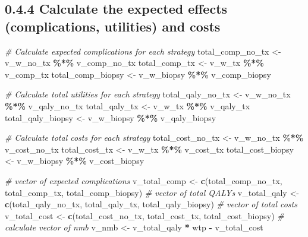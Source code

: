 \documentclass[
]{article}
\newenvironment{Shaded}{\begin{snugshade}}{\end{snugshade}}
\newcommand{\CommentTok}[1]{\textcolor[rgb]{0.56,0.35,0.01}{\textit{#1}}}
\newcommand{\FunctionTok}[1]{\textcolor[rgb]{0.13,0.29,0.53}{\textbf{#1}}}
\newcommand{\NormalTok}[1]{#1}
\newcommand{\OtherTok}[1]{\textcolor[rgb]{0.56,0.35,0.01}{#1}}
\newcommand{\SpecialCharTok}[1]{\textcolor[rgb]{0.81,0.36,0.00}{\textbf{#1}}}
\begin{document}
\hypertarget{calculate-the-expected-effects-complications-utilities-and-costs}{%
\subsection{0.4.4 Calculate the expected effects (complications,
utilities) and
costs}\label{calculate-the-expected-effects-complications-utilities-and-costs}}

\begin{Shaded}
\begin{Highlighting}[]
\CommentTok{\# Calculate expected complications for each strategy }
\NormalTok{total\_comp\_no\_tx  }\OtherTok{\textless{}{-}}\NormalTok{ v\_w\_no\_tx  }\SpecialCharTok{\%*\%}\NormalTok{  v\_comp\_no\_tx      }
\NormalTok{total\_comp\_tx     }\OtherTok{\textless{}{-}}\NormalTok{ v\_w\_tx     }\SpecialCharTok{\%*\%}\NormalTok{  v\_comp\_tx}
\NormalTok{total\_comp\_biopsy }\OtherTok{\textless{}{-}}\NormalTok{ v\_w\_biopsy }\SpecialCharTok{\%*\%}\NormalTok{  v\_comp\_biopsy}
  
\CommentTok{\# Calculate total utilities for each strategy }
\NormalTok{total\_qaly\_no\_tx  }\OtherTok{\textless{}{-}}\NormalTok{ v\_w\_no\_tx  }\SpecialCharTok{\%*\%}\NormalTok{  v\_qaly\_no\_tx      }
\NormalTok{total\_qaly\_tx     }\OtherTok{\textless{}{-}}\NormalTok{ v\_w\_tx     }\SpecialCharTok{\%*\%}\NormalTok{  v\_qaly\_tx}
\NormalTok{total\_qaly\_biopsy }\OtherTok{\textless{}{-}}\NormalTok{ v\_w\_biopsy }\SpecialCharTok{\%*\%}\NormalTok{  v\_qaly\_biopsy}
  
\CommentTok{\# Calculate total costs for each strategy }
\NormalTok{total\_cost\_no\_tx  }\OtherTok{\textless{}{-}}\NormalTok{ v\_w\_no\_tx  }\SpecialCharTok{\%*\%}\NormalTok{  v\_cost\_no\_tx    }
\NormalTok{total\_cost\_tx     }\OtherTok{\textless{}{-}}\NormalTok{ v\_w\_tx     }\SpecialCharTok{\%*\%}\NormalTok{  v\_cost\_tx}
\NormalTok{total\_cost\_biopsy }\OtherTok{\textless{}{-}}\NormalTok{ v\_w\_biopsy }\SpecialCharTok{\%*\%}\NormalTok{  v\_cost\_biopsy}
  

\CommentTok{\# vector of expected complications }
\NormalTok{v\_total\_comp }\OtherTok{\textless{}{-}} \FunctionTok{c}\NormalTok{(total\_comp\_no\_tx, total\_comp\_tx, total\_comp\_biopsy) }
\CommentTok{\# vector of total QALYs}
\NormalTok{v\_total\_qaly }\OtherTok{\textless{}{-}} \FunctionTok{c}\NormalTok{(total\_qaly\_no\_tx, total\_qaly\_tx, total\_qaly\_biopsy) }
\CommentTok{\# vector of total costs}
\NormalTok{v\_total\_cost }\OtherTok{\textless{}{-}} \FunctionTok{c}\NormalTok{(total\_cost\_no\_tx, total\_cost\_tx, total\_cost\_biopsy) }
\CommentTok{\# calculate vector of nmb}
\NormalTok{v\_nmb        }\OtherTok{\textless{}{-}}\NormalTok{ v\_total\_qaly }\SpecialCharTok{*}\NormalTok{ wtp }\SpecialCharTok{{-}}\NormalTok{ v\_total\_cost                      }
  

\end{Highlighting}
\end{Shaded}
\end{document}
